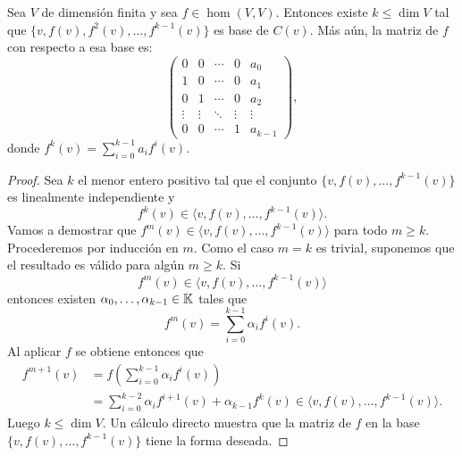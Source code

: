\begin{lem}
	Sea $V$ de dimensión finita y sea $f\in\hom(V,V)$. Entonces existe
	$k\leq\dim V$ tal que $\{v,f(v),f^2(v),\dots,f^{k-1}(v)\}$ es base de
	$C(v)$. Más aún, la matriz de $f$ con respecto a esa base es:
	\[
		\begin{pmatrix}
			0 & 0 & \cdots & 0 & a_0\\
			1 & 0 & \cdots & 0 & a_1\\
			0 & 1 & \cdots & 0 & a_2\\
			\vdots & \vdots & \ddots & \vdots & \vdots\\
			0 & 0 & \cdots & 1 & a_{k-1}
		\end{pmatrix},
	\]
	donde $f^k(v)=\sum_{i=0}^{k-1}a_if^i(v)$.

	\begin{proof}
        Sea $k$ el menor entero positivo tal que el conjunto
        $\{v,f(v),\dots,f^{k-1}(v)\}$ es linealmente independiente y 
		\[
			f^k(v)\in\langle v,f(v),\dots,f^{k-1}(v)\rangle.
		\]
		Vamos a demostrar que $f^m(v)\in\langle v,f(v),\dots,f^{k-1}(v)\rangle$
		para todo $m\geq k$. Procederemos por inducción en $m$. Como el caso
		$m=k$ es trivial, suponemos que el resultado es válido para algún
		$m\geq k$. Si
		\[
			f^{m}(v)\in\langle v,f(v),\dots,f^{k-1}(v)\rangle
		\]
		entonces existen
		$\alpha_0,\dots,\alpha_{k-1}\in\mathbb{K}$ tales que 
		\[
		f^m(v)=\sum_{i=0}^{k-1}\alpha_if^i(v).
		\]
		Al aplicar $f$ se obtiene entonces que 
		\begin{align*}
			f^{m+1}(v)&=f\left(\sum_{i=0}^{k-1}\alpha_if^i(v)\right)\\
			&=\sum_{i=0}^{k-2}\alpha_if^{i+1}(v)+\alpha_{k-1}f^k(v)\in\langle v,f(v),\dots,f^{k-1}(v)\rangle.
		\end{align*}
		Luego $k\leq\dim V$. Un cálculo directo muestra que la matriz de $f$ en
		la base $\{v,f(v),\dots,f^{k-1}(v)\}$ tiene la forma deseada. 
	\end{proof}
\end{lem}

